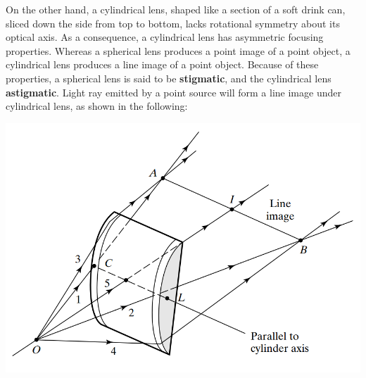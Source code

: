 \documentclass[11pt]{book}
\theoremstyle{break}
\theoremstyle{break}
\begin{document}
On the other hand, a cylindrical lens, shaped like a section of a soft drink can, sliced down the side from top to bottom, lacks rotational symmetry about its optical axis. As a consequence, a cylindrical lens has asymmetric focusing properties. Whereas a spherical lens produces a point image of a point object, a cylindrical lens produces a line image of a point object. Because of these properties, a spherical lens is said to be \textbf{stigmatic}, and the cylindrical lens \textbf{astigmatic}. Light ray emitted by a point source will form a line image under cylindrical lens, as shown in the following:
\begin{center}
\includegraphics[scale=0.45]{cylinSym.png}
\end{center}
\newpage
\end{document}
